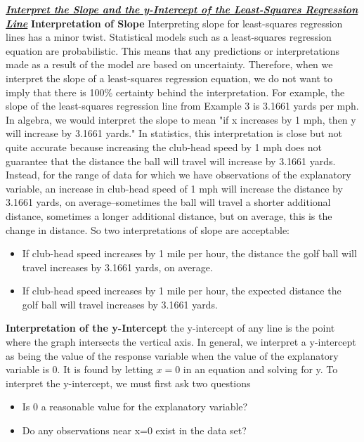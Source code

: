 \documentclass{report}
\begin{document}
    \bigbreak \noindent \bigbreak \noindent 
    \textbf{\textit{\underline{Interpret the Slope and the y-Intercept of the Least-Squares Regression Line}}}
    \bigbreak \noindent 
    \textbf{Interpretation of Slope}
    \bigbreak \noindent 
    Interpreting slope for least-squares regression lines has a minor twist. Statistical models such as a least-squares regression equation are probabilistic. This means that any predictions or interpretations made as a result of the model are based on uncertainty. Therefore, when we interpret the slope of a least-squares regression equation, we do not want to imply that there is 100\% certainty behind the interpretation. For example, the slope of the least-squares regression line from Example 3 is 3.1661 yards per mph. In algebra, we would interpret the slope to mean "if x increases by 1 mph, then y will increase by  3.1661 yards." In statistics, this interpretation is close but not quite accurate because increasing the club-head speed by 1 mph does not guarantee that the distance the ball will travel will increase by 3.1661 yards. Instead, for the range of data for which we have observations of the explanatory variable, an increase in club-head speed of 1 mph will increase the distance by 3.1661 yards, on average–sometimes the ball will travel a shorter additional distance, sometimes a longer additional distance, but on average, this is the change in distance. So two interpretations of slope are acceptable:
    \begin{itemize}
        \item  If club-head speed increases by 1 mile per hour, the distance the golf ball will travel increases by 3.1661 yards, on average.
        \item If club-head speed increases by 1 mile per hour, the expected distance the golf ball will travel increases by 3.1661 yards.
    \end{itemize}
    \bigbreak \noindent 
    \textbf{Interpretation of the y-Intercept}
    \bigbreak \noindent 
    the y-intercept of any line is the point where the graph intersects the vertical axis. In general, we interpret a y-intercept as being the value of the response variable when the value of the explanatory variable is 0. It is found by letting $x=0$ in an equation and solving for y. To interpret the y-intercept, we must first ask two questions
    \begin{itemize}
        \item Is 0 a reasonable value for the explanatory variable?
        \item Do any observations near x=0 exist in the data set?
    \end{itemize}
\end{document}
